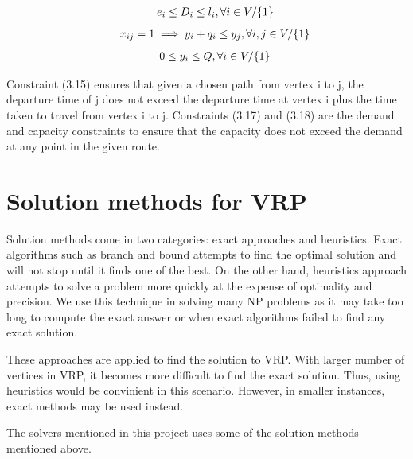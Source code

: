 \documentclass[a4paper, 12pt]{report}
\begin{document}
\begin{equation}
    \begin{array}{ll@{}ll@{}ll}
        & e_{i} \leq D_{i} \leq l_{i}, \forall i \in V / \{1\}
    \end{array}
\end{equation}
\begin{equation}
    \begin{array}{ll@{}ll@{}ll}
        & x_{ij} = 1 \implies y_{i} + q_{i} \leq y_{j}, \forall i, j \in V / \{1\}
    \end{array}
\end{equation}
\begin{equation}
    \begin{array}{ll@{}ll@{}ll}
        & 0 \leq y_{i} \leq Q, \forall i \in V / \{1\}
    \end{array}
\end{equation}

\vspace{1cm}

Constraint (3.15) ensures that given a chosen path from vertex i to j, the departure time of j does not exceed the
departure time at vertex i plus the time taken to travel from vertex i to j. Constraints (3.17) and (3.18) are the
demand and capacity constraints to ensure that the capacity does not exceed the demand at any point in the given route.

\section{Solution methods for VRP}
Solution methods come in two categories: exact approaches and heuristics. Exact algorithms such as branch and bound attempts
to find the optimal solution and will not stop until it finds one of the best. On the other hand, heuristics approach
 attempts to solve a problem more quickly at the expense of optimality and precision. We use this technique in
solving many NP problems as it may take too long to compute the exact answer or when exact algorithms failed to find any exact solution.

These approaches are applied to find the solution to VRP. With larger number of vertices in VRP, it becomes more difficult
to find the exact solution. Thus, using heuristics would be convinient in this scenario. However, in smaller instances,
exact methods may be used instead.

The solvers mentioned in this project uses some of the solution methods mentioned above.
\end{document}
